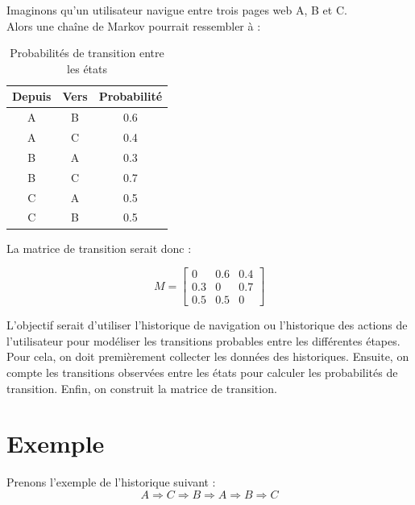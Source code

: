 \documentclass[a4paper, 11pt]{report}
\begin{document}
Imaginons qu'un utilisateur navigue entre trois pages web A, B et C. \\
Alors une chaîne de Markov pourrait ressembler à :


\begin{table}[h!]
	\centering
	\begin{tabular}{|c|c|c|}
		\hline
		\textbf{Depuis} & \textbf{Vers} & \textbf{Probabilité} \\
		\hline
		A               & B             & 0.6                  \\
		A               & C             & 0.4                  \\
		B               & A             & 0.3                  \\
		B               & C             & 0.7                  \\
		C               & A             & 0.5                  \\
		C               & B             & 0.5                  \\
		\hline
	\end{tabular}
	\caption{Probabilités de transition entre les états}
\end{table}


\newpage
La matrice de transition serait donc :

\[
	M =
	\begin{bmatrix}
		0   & 0.6 & 0.4 \\
		0.3 & 0   & 0.7 \\
		0.5 & 0.5 & 0
	\end{bmatrix}
\]


L'objectif serait d'utiliser l'historique de navigation ou l'historique des actions de l'utilisateur pour modéliser les transitions probables entre les différentes étapes. Pour cela, on doit premièrement collecter les données des historiques. Ensuite, on compte les transitions observées entre les états pour calculer les probabilités de transition. Enfin, on construit la matrice de transition.

\section{Exemple}

\noindent{}Prenons l'exemple de l'historique suivant :
\[
	A \Longrightarrow C \Longrightarrow B \Longrightarrow A \Longrightarrow B \Longrightarrow C
\]
\end{document}
